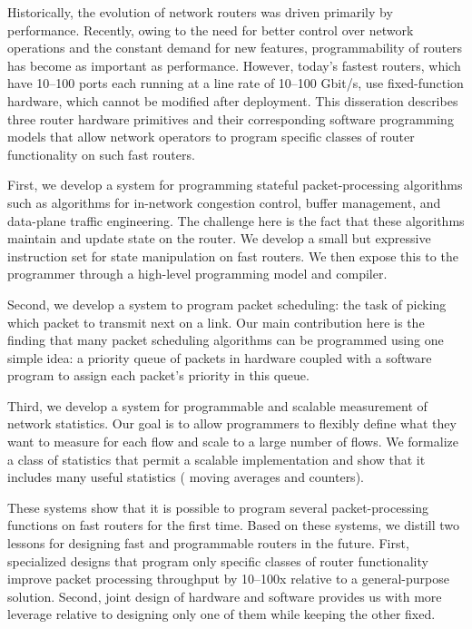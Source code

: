 % 
% 
%
Historically, the evolution of network routers was driven primarily by
performance. Recently, owing to the need for better control over network
operations and the constant demand for new features, programmability of routers
has become as important as performance.  However, today's fastest routers,
which have 10--100 ports each running at a line rate of 10--100 Gbit/s, use
fixed-function hardware, which cannot be modified after deployment. This
disseration describes three router hardware primitives and their
corresponding software programming models that allow network operators to
program specific classes of router functionality on such fast routers.

First, we develop a system for programming stateful packet-processing
algorithms such as algorithms for in-network congestion control, buffer
management, and data-plane traffic engineering. The challenge here is the fact
that these algorithms maintain and update state on the router.  We develop a
small but expressive instruction set for state manipulation on fast routers.
 We then expose this to the programmer through a high-level programming model
and compiler.

Second, we develop a system to program packet scheduling: the task of picking
which packet to transmit next on a link. Our main contribution here is the
finding that many packet scheduling algorithms can be programmed using one
simple idea: a priority queue of packets in hardware coupled with a software
program to assign each packet's priority in this queue.

Third, we develop a system for programmable and scalable measurement of network
statistics. Our goal is to allow programmers to flexibly define what they want
to measure for each flow and scale to a large number of flows. We formalize
a class of statistics that permit a scalable
implementation and show that it includes many useful statistics (\eg
moving averages and counters).

These systems show that it is possible to program several packet-processing
functions on fast routers for the first time. Based on these systems, we
distill two lessons for designing fast and programmable routers in the future.
First, specialized designs that program only specific classes of router
functionality improve packet processing throughput by 10--100x relative to a general-purpose
solution. Second, joint design of
hardware and software provides us with more leverage relative to designing only
one of them while keeping the other fixed.
